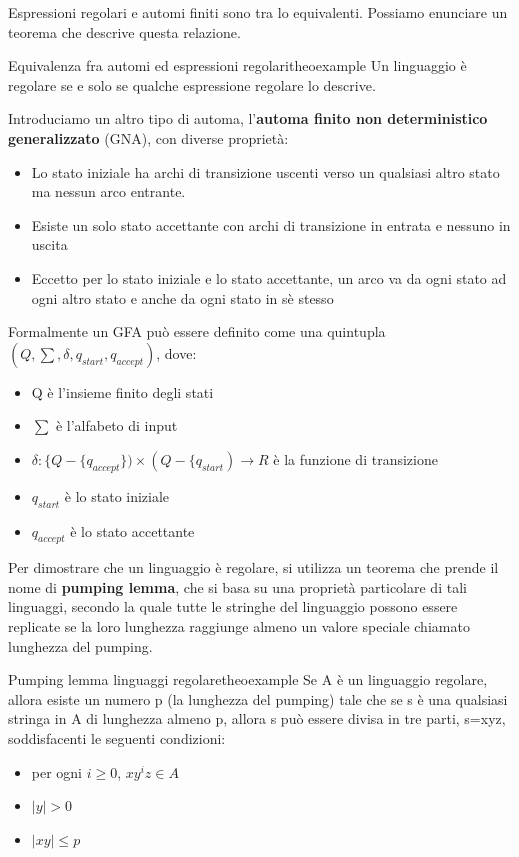 \documentclass[a4paper]{extarticle}
\begin{document}
Espressioni regolari e automi finiti sono tra lo equivalenti. Possiamo enunciare un teorema che descrive questa relazione.
\begin{teorema}{Equivalenza fra automi ed espressioni regolari}{theoexample}
Un linguaggio è regolare se e solo se qualche espressione regolare lo descrive.
\end{teorema}
Introduciamo un altro tipo di automa, l'\textbf{automa finito non deterministico generalizzato} (GNA), con diverse proprietà:
\begin{itemize}
\item Lo stato iniziale ha archi di transizione uscenti verso un qualsiasi altro stato ma nessun arco entrante.
\item Esiste un solo stato accettante con archi di transizione in entrata e nessuno in uscita
\item Eccetto per lo stato iniziale e lo stato accettante, un arco va da ogni stato ad ogni altro stato e anche da ogni stato in sè stesso
\end{itemize}
Formalmente un GFA può essere definito come una quintupla $(Q,\sum,\delta,q_{start},q_{accept})$, dove:
\begin{itemize}
\item Q è l'insieme finito degli stati
\item $\sum$ è l'alfabeto di input 
\item $\delta:\{ Q-\{q_{accept}\})\times (Q-\{q_{start}) \longrightarrow R$ è la funzione di transizione
\item $q_{start}$ è lo stato iniziale
\item $q_{accept}$ è lo stato accettante   
\end{itemize}

Per dimostrare che un linguaggio è regolare, si utilizza un teorema che prende il nome di \textbf{pumping lemma}, che si basa su una proprietà particolare di tali linguaggi, secondo la quale tutte le stringhe del linguaggio possono essere replicate se la loro lunghezza raggiunge almeno un valore speciale chiamato lunghezza del pumping.

\begin{teorema}{Pumping lemma linguaggi regolare}{theoexample}
Se A è un linguaggio regolare, allora esiste un numero p (la lunghezza del pumping) tale che se s è una qualsiasi stringa in A di lunghezza almeno p, allora s può essere divisa in tre parti, s=xyz, soddisfacenti le seguenti condizioni:
\begin{itemize}
\item per ogni $i\geq0$, $xy^iz \in A$
\item $|y|>0$
\item $|xy| \leq p$
\end{itemize}
\end{teorema}
\end{document}
